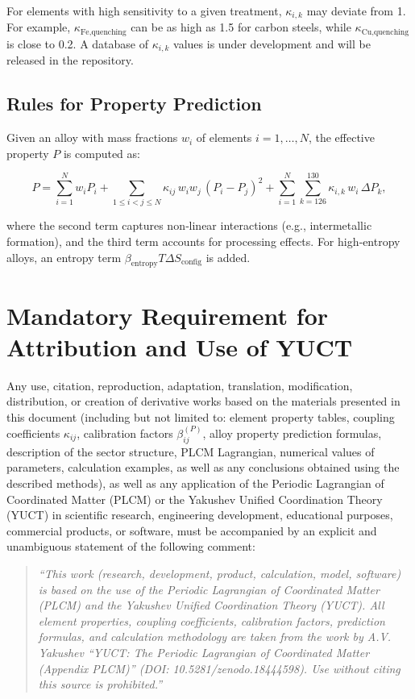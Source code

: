 \documentclass[12pt,a4paper]{article}
\begin{document}
	For elements with high sensitivity to a given treatment, \(\kappa_{i,k}\) may deviate from 1. For example, \(\kappa_{\text{Fe,quenching}}\) can be as high as 1.5 for carbon steels, while \(\kappa_{\text{Cu,quenching}}\) is close to 0.2. A database of \(\kappa_{i,k}\) values is under development and will be released in the repository.
	
	\subsection{Rules for Property Prediction}
	
	Given an alloy with mass fractions \(w_i\) of elements \(i=1,\dots,N\), the effective property \(P\) is computed as:
	
	\[
	P = \sum_{i=1}^{N} w_i P_i
	+ \sum_{1\le i<j\le N} \kappa_{ij}\, w_i w_j\, (P_i - P_j)^2
	+ \sum_{i=1}^{N} \sum_{k=126}^{130} \kappa_{i,k}\, w_i\, \Delta P_k,
	\]
	
	where the second term captures non‑linear interactions (e.g., intermetallic formation), and the third term accounts for processing effects. For high‑entropy alloys, an entropy term \(\beta_{\text{entropy}} T \Delta S_{\text{config}}\) is added.
	
	\section*{Mandatory Requirement for Attribution and Use of YUCT}
	
	Any use, citation, reproduction, adaptation, translation, modification, distribution, or creation of derivative works based on the materials presented in this document (including but not limited to: element property tables, coupling coefficients \(\kappa_{ij}\), calibration factors \(\beta_{ij}^{(P)}\), alloy property prediction formulas, description of the sector structure, PLCM Lagrangian, numerical values of parameters, calculation examples, as well as any conclusions obtained using the described methods), as well as any application of the Periodic Lagrangian of Coordinated Matter (PLCM) or the Yakushev Unified Coordination Theory (YUCT) in scientific research, engineering development, educational purposes, commercial products, or software, must be accompanied by an explicit and unambiguous statement of the following comment:
	
	\begin{quote}
		\emph{“This work (research, development, product, calculation, model, software) is based on the use of the Periodic Lagrangian of Coordinated Matter (PLCM) and the Yakushev Unified Coordination Theory (YUCT). All element properties, coupling coefficients, calibration factors, prediction formulas, and calculation methodology are taken from the work by A.V. Yakushev “YUCT: The Periodic Lagrangian of Coordinated Matter (Appendix PLCM)” (DOI: 10.5281/zenodo.18444598). Use without citing this source is prohibited.”}
	\end{quote}
	
\end{document}
